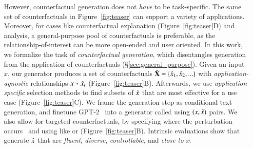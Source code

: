 % 
However, counterfactual generation does not \emph{have} to be task-specific.
The same set of counterfactuals in Figure~\ref{fig:teaser} can support a variety of applications.
Moreover, for cases like counterfactual explanation (Figure~\ref{fig:teaser}D) and analysis, a general-purpose pool of counterfactuals is preferable, as the relationship-of-interest can be more open-ended and user oriented.
In this work, we formalize the task of \emph{counterfactual generation}, which disentangles generation from the application of counterfactuals (\S\ref{sec:general_purpose}).
Given an input $x$, our generator produces a set of counterfactuals $\hat{\mathbf{X}} = \{\hat{x}_1, \hat{x}_2, ...\}$ with \emph{application-agnostic} relationships $x \veryshortarrow \xp_i$ (Figure~\ref{fig:teaser}B).
Afterwards, we use \emph{application-specific} selection methods to find subsets of $\hat{x}$ that are most effective for a use case (Figure~\ref{fig:teaser}C).
We frame the generation step as conditional text generation, and finetune GPT-2~\cite{radford2019language} into a generator called \emph{\sysname} using $(x, \hat{x})$ pairs. 
We also allow for targeted counterfactuals, by specifying where the perturbation occurs~\cite{donahue2020enabling} and using \tagstrs like  or  (Figure~\ref{fig:teaser}B).
Intrinsic evaluations show that \sysname generate $\hat{x}$ that are \emph{fluent}, \emph{diverse}, \emph{controllable}, and \emph{close to $x$}.

